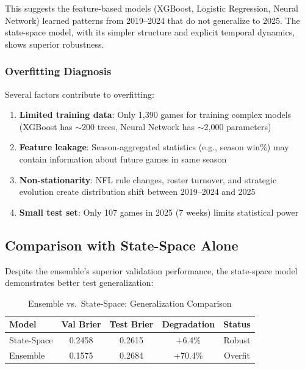 This suggests the feature-based models (XGBoost, Logistic Regression, Neural Network) learned patterns from 2019--2024 that do not generalize to 2025. The state-space model, with its simpler structure and explicit temporal dynamics, shows superior robustness.

\subsubsection{Overfitting Diagnosis}

Several factors contribute to overfitting:

\begin{enumerate}
    \item \textbf{Limited training data}: Only 1,390 games for training complex models (XGBoost has $\sim$200 trees, Neural Network has $\sim$2,000 parameters)
    \item \textbf{Feature leakage}: Season-aggregated statistics (e.g., season win\%) may contain information about future games in same season
    \item \textbf{Non-stationarity}: NFL rule changes, roster turnover, and strategic evolution create distribution shift between 2019--2024 and 2025
    \item \textbf{Small test set}: Only 107 games in 2025 (7 weeks) limits statistical power
\end{enumerate}

\subsection{Comparison with State-Space Alone}

Despite the ensemble's superior validation performance, the state-space model demonstrates better test generalization:

\begin{table}[h]
\centering
\caption{Ensemble vs.\ State-Space: Generalization Comparison}
\label{tab:ensemble-vs-state-space-generalization}
\begin{tabular}{lcccc}
\toprule
\textbf{Model} & \textbf{Val Brier} & \textbf{Test Brier} & \textbf{Degradation} & \textbf{Status} \\
\midrule
State-Space & 0.2458 & 0.2615 & +6.4\% & Robust \\
Ensemble & 0.1575 & 0.2684 & +70.4\% & Overfit \\
\bottomrule
\end{tabular}
\end{table}

